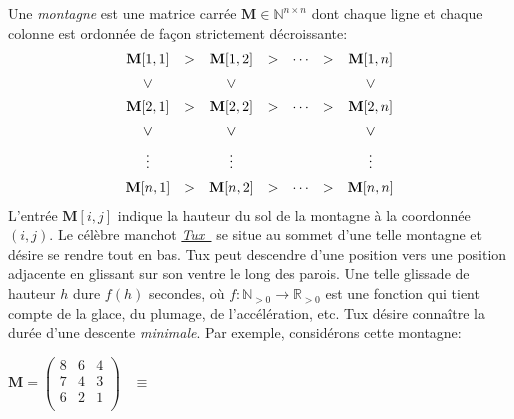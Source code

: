 \documentclass{article}
\newcommand{\N}{\mathbb{N}}                      %
\newcommand{\R}{\mathbb{R}}                      %
\newcommand{\mat}[1]{\mathbf{#1}}                %
\begin{document}
\begin{question}
  Une \emph{montagne} est une matrice carrée $\mat{M} \in \N^{n \times
    n}$ dont chaque ligne et chaque colonne est ordonnée de façon
  strictement décroissante:\medskip
  \[
  \begin{array}{ccccccc}
    \mat{M}[1, 1] &>& \mat{M}[1, 2] &>& \cdots &>& \mat{M}[1, n] \\[5pt]

    \rotatebox[origin=c]{-90}{$>$} &&
    \rotatebox[origin=c]{-90}{$>$} && &&
    \rotatebox[origin=c]{-90}{$>$} \\[5pt]

    \mat{M}[2, 1] &>& \mat{M}[2, 2] &>& \cdots &>& \mat{M}[2, n] \\[5pt]

    \rotatebox[origin=c]{-90}{$>$} &&
    \rotatebox[origin=c]{-90}{$>$} && &&
    \rotatebox[origin=c]{-90}{$>$} \\[5pt]

    \vdots && \vdots && && \vdots \\[5pt]

    \mat{M}[n, 1] &>& \mat{M}[n, 2] &>& \cdots &>& \mat{M}[n, n]
  \end{array}\smallskip
  \] L'entrée $\mat{M}[i, j]$ indique la hauteur du sol de la montagne
  à la coordonnée $(i, j)$. Le célèbre manchot
  \href{https://fr.wikipedia.org/wiki/Tux}{\emph{Tux~\faLinux}} se
  situe au sommet d'une telle montagne et désire se rendre tout en
  bas. Tux peut descendre d'une position vers une position adjacente
  en glissant sur son ventre le long des parois. Une telle glissade de
  hauteur $h$ dure $f(h)$ secondes, où $f \colon \N_{> 0} \to \R_{>
    0}$ est une fonction qui tient compte de la glace, du plumage, de
  l'accélération, etc. Tux désire connaître la durée d'une descente
  \emph{minimale}. Par exemple, considérons cette montagne:
  \begin{center}
    \vspace*{-15pt}
    \hfill\hfill\hfill\hfill    
      \begin{minipage}[c]{.48\linewidth}
        $\mat{M} = \begin{pmatrix}
          8 & 6 & 4 \\
          7 & 4 & 3 \\
          6 & 2 & 1 \\
        \end{pmatrix}$
        \quad\ $\equiv$
      \end{minipage}\hspace{-3.7cm}
      \begin{minipage}[c]{.48\linewidth}
      \end{minipage}
  \end{center}


\end{question}
\end{document}
